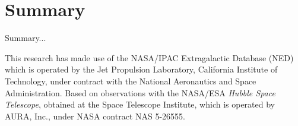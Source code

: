 \documentclass[iop]{emulateapj-rtx4}
\begin{document}
\section{Summary}

Summary...

This research has made use of the NASA/IPAC Extragalactic Database (NED) which is operated by the Jet Propulsion Laboratory, California Institute of Technology, under contract with the National Aeronautics and Space Administration. Based on observations with the NASA/ESA \textit{Hubble Space Telescope}, obtained at the Space Telescope Institute, which is operated by AURA, Inc., under NASA contract NAS 5-26555.


\nocite{*}


\end{document}

